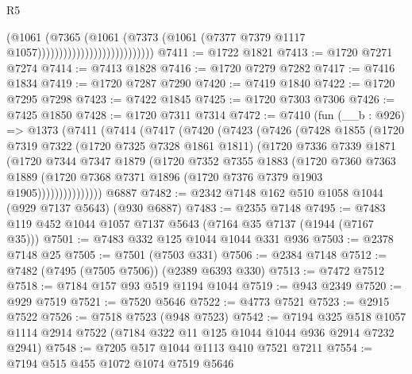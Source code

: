 \begin{lexlean}{R5}
\begin{coremodule}
                                              (@1061
                                                (@7365
                                                  (@1061
                                                    (@7373
                                                      (@1061
                                                        (@7377
                                                          @7379
                                                          @1117
                                                          @1057)))))))))))))))))))))))))))
@7411 := @1722 @1821
@7413 := @1720 @7271 @7274
@7414 := @7413 @1828
@7416 := @1720 @7279 @7282
@7417 := @7416 @1834
@7419 := @1720 @7287 @7290
@7420 := @7419 @1840
@7422 := @1720 @7295 @7298
@7423 := @7422 @1845
@7425 := @1720 @7303 @7306
@7426 := @7425 @1850
@7428 := @1720 @7311 @7314
@7472 := @7410
    (fun (__b : @926) =>
    @1373
      (@7411
        (@7414
          (@7417
            (@7420
              (@7423
                (@7426
                  (@7428
                    @1855
                    (@1720
                      @7319
                      @7322
                      (@1720 @7325 @7328 @1861 @1811)
                      (@1720
                        @7336
                        @7339
                        @1871
                        (@1720
                          @7344
                          @7347
                          @1879
                          (@1720
                            @7352
                            @7355
                            @1883
                            (@1720
                              @7360
                              @7363
                              @1889
                              (@1720 @7368 @7371 @1896 (@1720 @7376 @7379 @1903 @1905)))))))))))))))
    @6887
@7482 := @2342 @7148 @162 @510 @1058 @1044 (@929 @7137 @5643) (@930 @6887)
@7483 := @2355 @7148
@7495 := @7483 @119 @452 @1044 @1057 @7137 @5643 (@7164 @35 @7137 (@1944 (@7167 @35)))
@7501 := @7483 @332 @125 @1044 @1044 @331 @936
@7503 := @2378 @7148 @25
@7505 := @7501 (@7503 @331)
@7506 := @2384 @7148
@7512 := @7482 (@7495 (@7505 @7506)) (@2389 @6393 @330)
@7513 := @7472 @7512
@7518 := @7184 @157 @93 @519 @1194 @1044
@7519 := @943 @2349
@7520 := @929 @7519
@7521 := @7520 @5646
@7522 := @4773 @7521
@7523 := @2915 @7522
@7526 := @7518 @7523 (@948 @7523)
@7542 := @7194
    @325
    @518
    @1057
    @1114
    @2914
    @7522
    (@7184 @322 @11 @125 @1044 @1044 @936 @2914 @7232 @2941)
@7548 := @7205 @517 @1044 @1113 @410 @7521 @7211
@7554 := @7194 @515 @455 @1072 @1074 @7519 @5646

\end{coremodule}
\end{lexlean}
